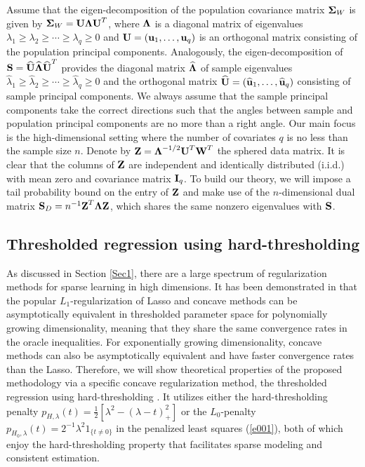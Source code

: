 \documentclass{statsoc}
\newcommand{\bu}{\mbox{\bf u}}
\newcommand{\bI}{\mbox{\bf I}}
\newcommand{\bS}{\mbox{\bf S}}
\newcommand{\bU}{\mbox{\bf U}}
\newcommand{\bW}{\mbox{\bf W}}
\newcommand{\bZ}{\mbox{\bf Z}}
\newcommand{\bLambda}{\mbox{\boldmath $\Lambda$}}
\newcommand{\bSig}{\mbox{\boldmath $\Sigma$}}
\def\t{^T}
\begin{document}
Assume that the eigen-decomposition of the population covariance matrix $\bSig_W$ is given by $\bSig_W = \bU \bLambda \bU\t$, where $\bLambda$ is a diagonal matrix of eigenvalues $\lambda_1 \geq \lambda_2 \geq \cdots \geq \lambda_q \geq 0$ and $\bU = (\bu_1, \dots, \bu_q)$ is an orthogonal matrix consisting of the population principal components. Analogously, the eigen-decomposition of $\bS = \widehat{\bU}\widehat{\bLambda}\widehat{\bU}\t$ provides the diagonal matrix $\widehat{\bLambda}$ of sample eigenvalues $\widehat{\lambda}_1 \geq \widehat{\lambda}_2 \geq \cdots \geq \widehat{\lambda}_q \geq 0$ and the orthogonal matrix $\widehat{\bU} = (\widehat{\bu}_1, \dots, \widehat{\bu}_q)$ consisting of sample principal components. We always assume that the sample principal components take the correct directions such that the angles between sample and population principal components are no more than a right angle. Our main focus is the high-dimensional setting where the number of covariates $q$ is no less than the sample size $n$. Denote by $\bZ = \bLambda^{-1/2}\bU\t \bW\t$ the sphered data matrix. It is clear that the columns of $\bZ$ are independent and identically distributed (i.i.d.) with mean zero and covariance matrix $\bI_q$. To build our theory, we will impose a tail probability bound on the entry of $\bZ$ and make use of the $n$-dimensional dual matrix $\bS_D = n^{-1} \bZ\t \bLambda \bZ$, which shares the same nonzero eigenvalues with $\bS$. %

\subsection{Thresholded regression using hard-thresholding} \label{Secthred}


As discussed in Section \ref{Sec1}, there are a large spectrum of regularization methods for sparse learning in high dimensions. It has been demonstrated in \cite{FanLv2013} that the popular $L_1$-regularization of Lasso and concave methods can be asymptotically equivalent in thresholded parameter space for polynomially growing dimensionality, meaning that they share the same convergence rates in the oracle inequalities. For exponentially growing dimensionality, concave methods can also be asymptotically equivalent and have faster convergence rates than the Lasso. Therefore, we will show theoretical properties of the proposed methodology via a specific concave regularization method, the thresholded regression using hard-thresholding \citep{Zheng2014}. It utilizes either the hard-thresholding penalty $p_{H, \lambda}(t) = \frac{1}{2} \left[\lambda^2 - (\lambda - t)_+^2\right]$ or the $L_0$-penalty $p_{H_0, \lambda}(t) = 2^{-1} \lambda^2 1_{\{t \neq 0\}}$ in the penalized least squares (\ref{e001}), both of which enjoy the hard-thresholding property \citep[Lemma 1]{Zheng2014} that facilitates sparse modeling and consistent estimation.
\end{document}
